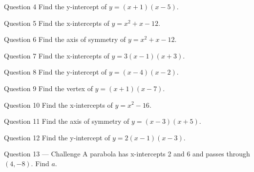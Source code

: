 \documentclass[11pt]{article}
\begin{document}
\begin{qbox}{Question 4}
Find the y-intercept of $y=(x+1)(x-5)$.\workspace{2.4cm}
\end{qbox}

\begin{qbox}{Question 5}
Find the x-intercepts of $y=x^2+x-12$.\workspace{2.4cm}
\end{qbox}

\begin{qbox}{Question 6}
Find the axis of symmetry of $y=x^2+x-12$.\workspace{2.4cm}
\end{qbox}

\begin{qbox}{Question 7}
Find the x-intercepts of $y=3(x-1)(x+3)$.\workspace{2.4cm}
\end{qbox}

\begin{qbox}{Question 8}
Find the y-intercept of $y=(x-4)(x-2)$.\workspace{2.4cm}
\end{qbox}

\begin{qbox}{Question 9}
Find the vertex of $y=(x+1)(x-7)$.\workspace{2.4cm}
\end{qbox}

\begin{qbox}{Question 10}
Find the x-intercepts of $y=x^2-16$.\workspace{2.4cm}
\end{qbox}

\begin{qbox}{Question 11}
Find the axis of symmetry of $y=(x-3)(x+5)$.\workspace{2.4cm}
\end{qbox}

\begin{qbox}{Question 12}
Find the y-intercept of $y=2(x-1)(x-3)$.\workspace{2.4cm}
\end{qbox}

\begin{qbox}{Question 13 --- Challenge}
A parabola has x-intercepts 2 and 6 and passes through $(4,-8)$. Find $a$.\workspace{3cm}
\end{qbox}

\clearpage
{}
\end{document}
